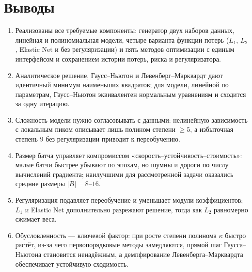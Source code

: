 \documentclass[a4paper,12pt]{article}
\theoremstyle{definition}
\begin{document}
\section{Выводы}

\begin{enumerate}
    \item Реализованы все требуемые компоненты: генератор двух наборов данных, линейная и
          полиномиальная модели, четыре варианта функции потерь ($L_1$, $L_2$, Elastic Net и без
          регуляризации) и пять методов оптимизации с единым интерфейсом и сохранением истории
          потерь, риска и регуляризатора.
    \item Аналитическое решение, Гаусс--Ньютон и Левенберг--Марквардт дают идентичный минимум
          наименьших квадратов; для модели, линейной по параметрам, Гаусс--Ньютон эквивалентен
          нормальным уравнениям и сходится за одну итерацию.
    \item Сложность модели нужно согласовывать с данными: нелинейную зависимость с локальным
          пиком описывает лишь полином степени $\geq 5$, а избыточная степень $9$ без
          регуляризации приводит к переобучению.
    \item Размер батча управляет компромиссом «скорость--устойчивость--стоимость»: малые батчи
          быстрее убывают по эпохам, но шумны и дороги по числу вычислений градиента; наилучшими
          для рассмотренной задачи оказались средние размеры $|B| = 8$--$16$.
    \item Регуляризация подавляет переобучение и уменьшает модули коэффициентов; $L_1$ и Elastic
          Net дополнительно разрежают решение, тогда как $L_2$ равномерно сжимает веса.
    \item Обусловленность — ключевой фактор: при росте степени полинома $\kappa$ быстро растёт,
          из-за чего первопорядковые методы замедляются, прямой шаг Гаусса--Ньютона становится
          ненадёжным, а демпфирование Левенберга--Марквардта обеспечивает устойчивую сходимость.
\end{enumerate}
\end{document}
